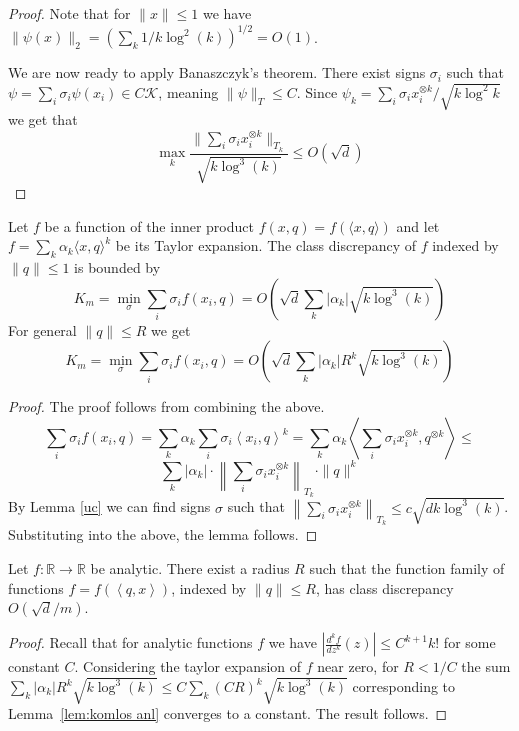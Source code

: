 \documentclass[anon,12pt]{colt2019} %
\newcommand{\ip}[1]{\left \langle #1 \right \rangle}
\newcommand{\R}{\mathbb{R}}
\begin{document}
\begin{proof}
\noindent Note that for $\|x\| \le 1$ we have $\|\psi(x)\|_2 = (\sum_k  1/k\log^2(k))^{1/2} = O(1)$.


We are now ready to apply Banaszczyk's theorem. 
There exist signs $\sigma_i$ such that $\psi  = \sum_i \sigma_i \psi(x_i) \in C \mathcal K$, meaning $\|\psi\|_T \leq C$.
Since $\psi_k = \sum_i \sigma_i x_i^{\otimes k}/\sqrt{k \log^2{k}}$ we get that 
$$\max_k \frac{\|\sum_i \sigma_i  x_i^{\otimes k}\|_{T_k}}{\sqrt{k \log^{3}(k)}} \le O\left( \sqrt{d} \right)$$
\end{proof}

\begin{lemma} \label{lem:komlos anl}
Let $f$ be a function of the inner product $f(x,q) = f(\langle x,q\rangle)$ and let $f = \sum_k \alpha_k \langle x,q\rangle^k$ be its Taylor expansion. 
The class discrepancy of $f$ indexed by $\|q\| \leq 1$ is bounded by
\[
K_m = \min_\sigma \sum_i \sigma_i f(x_i,q) =O\left( \sqrt{d} \sum_k  |\alpha_k|\sqrt{k\log^3(k)}\right)
\]
For general $\|q\| \leq R$ we get
\[
K_m = \min_\sigma \sum_i \sigma_i f(x_i,q) =O\left( \sqrt{d} \sum_k  |\alpha_k| R^k \sqrt{ k\log^3(k)}\right)
\]
\end{lemma}
\begin{proof}
The proof follows from combining the above.
$$
\sum_i \sigma_i f(x_i,q) = \sum_k \alpha_k \sum_i \sigma_i \ip{ x_i,q}^k =  \sum_k \alpha_k  \ip{  \sum_i \sigma_i x_i^{\otimes k},q^{\otimes k}} \le $$
$$\sum_k |\alpha_k| \cdot \left\| \sum_i \sigma_i x_i^{\otimes k}\right\|_{T_k} \cdot \|q\|^k
$$
By Lemma \ref{uc} we can find signs $\sigma$ such that 
$\left\| \sum_i \sigma_i x_i^{\otimes k}\right\|_{T_k} \le c\sqrt{d k \log^3(k)}$. Substituting into the above, the lemma follows.
\end{proof}

\begin{theorem}\label{analitic1}
Let $f:\R\rightarrow\R$ be analytic. There exist a radius $R$ such that the function family of functions $f = f(\ip{q,x})$, indexed by $\|q\| \leq R$, has class discrepancy $O(\sqrt{d}/m)$. 
\end{theorem}
\begin{proof}
Recall that for analytic functions $f$ we have $\left| \frac{d^k f}{dz^k}(z) \right|  \leq C^{k+1} k! $
for some constant $C$. Considering the taylor expansion of $f$ near zero, for $R < 1/C$ the sum
$ \sum_k  |\alpha_k| R^k \sqrt{ k\log^3(k)} \leq C \sum_k  (CR)^k \sqrt{ k\log^3(k)}$
corresponding to Lemma~\ref{lem:komlos anl} converges to a constant. The result follows.
\end{proof}
\end{document}

